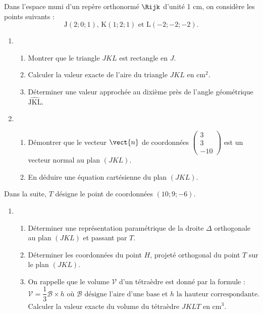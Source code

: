 Dans l'espace muni d'un repère orthonormé $\Rijk$ d'unité 1 cm, on considère les points suivants : %
\[\text{J}(2;0;1) \text{, } \text{K}(1;2;1) \text{ et } \text{L}(-2;-2;-2).\]
%
\begin{enumerate}
	\item 
	\begin{enumerate}
		\item Montrer que le triangle $JKL$ est rectangle en $J$.
		\item Calculer la valeur exacte de l'aire du triangle $JKL$ en cm$^2$.
		\item Déterminer une valeur approchée au dixième près de l'angle géométrique $\widehat{\text{JKL}}$.
	\end{enumerate}
	\item
	\begin{enumerate}
		\item Démontrer que le vecteur $\vect{n}$ de coordonnées $\begin{pmatrix}3\\3\\-10\end{pmatrix}$ est un vecteur normal au plan $(JKL)$.
		\item En déduire une équation cartésienne du plan $(JKL)$.
	\end{enumerate}
\end{enumerate}

Dans la suite, $T$ désigne le point de coordonnées $(10;9;-6)$.

\begin{enumerate}[resume]
	\item
	\begin{enumerate}
		\item Déterminer une représentation paramétrique de la droite $\Delta$ orthogonale au plan $(JKL)$ et passant par $T$.
		\item Déterminer les coordonnées du point $H$, projeté orthogonal du point $T$ sur le plan $(JKL)$.
		\item On rappelle que le volume $\mathcal{V}$ d'un tétraèdre est donné par la formule : \[\mathcal{V}  = \dfrac13 \mathcal{B} \times h \text{ où }  \mathcal{B} \text{ désigne l'aire d'une base et } h \text{ la hauteur correspondante}.\]
		Calculer la valeur exacte du volume du tétraèdre $JKLT$ en cm$^3$.
	\end{enumerate}
\end{enumerate}

